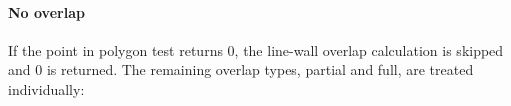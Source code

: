 \documentclass[10pt]{article}
\begin{document}
	\paragraph{No overlap}
	If the point in polygon test returns 0, the line-wall overlap calculation
	is skipped and 0 is returned. The remaining overlap types, partial and full,
	are treated individually:\\

\end{document}
